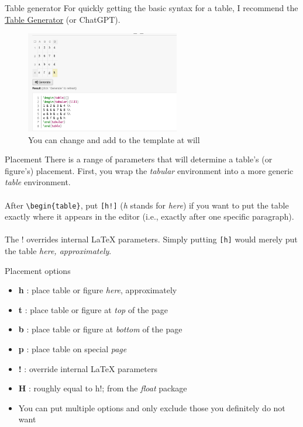 \documentclass{beamer}
\begin{document}
\begin{frame}{Table generator}
For quickly getting the basic syntax for a table, I recommend the \href{https://www.tablesgenerator.com/\#}{Table Generator} (or ChatGPT).\\
\begin{figure}
    \centering
    \includegraphics[width=0.6\textwidth]{table_generator.png}
    \caption{You can change and add to the template at will}
    \label{fig:table_generator}
\end{figure}
\end{frame}

\begin{frame}[fragile]{Placement}
There is a range of parameters that will determine a table's (or figure's) placement. First, you wrap the \textit{tabular} environment into a more generic \textit{table} environment.\\~\\
\pause
After \verb|\begin{table}|, put \verb|[h!]| (\textit{h} stands for \textit{here}) if you want to put the table exactly where it appears in the editor (i.e., exactly after one specific paragraph).\\~\\
\pause
The ! overrides internal LaTeX parameters. Simply putting \verb|[h]| would merely put the table \textit{here, approximately}. 
\end{frame}

\begin{frame}{Placement options}
\begin{itemize}
    \item \textbf{h} : place table or figure \textit{here}, approximately
    \item \textbf{t} : place table or figure at \textit{top} of the page
    \item \textbf{b} : place table or figure at \textit{bottom} of the page
    \item \textbf{p} : place table on special \textit{page}
    \item \textbf{!} : override internal LaTeX parameters
    \item \textbf{H} : roughly equal to h!; from the \textit{float} package
    \item You can put multiple options and only exclude those you definitely do not want 
\end{itemize}    
\end{frame}
\end{document}
